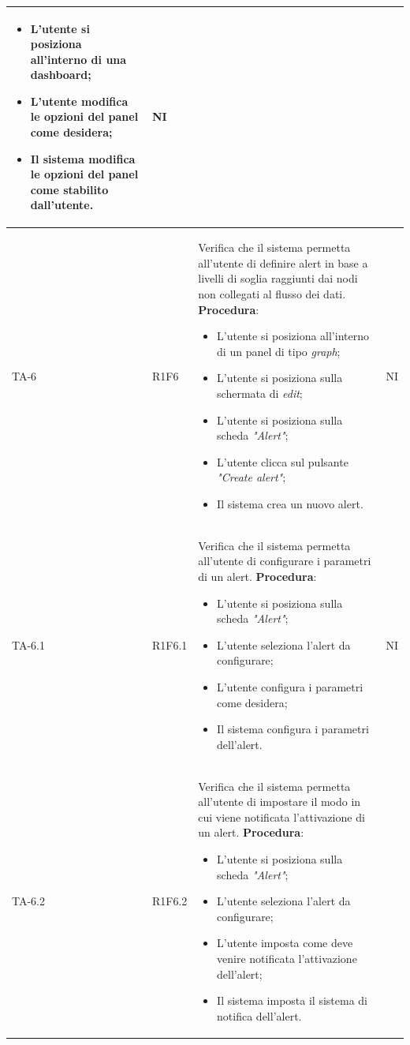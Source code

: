 \begin{longtable}{|C{2.5cm}|C{2.5cm}|L{6.5cm}|C{1.5cm}|}
\begin{itemize}
		\item L'utente si posiziona all'interno di una dashboard;
		\item L'utente modifica le opzioni del panel come desidera;
		\item Il sistema modifica le opzioni del panel come stabilito dall'utente.
	\end{itemize}
	 & {NI}\\
	\hline
	{TA-6} & {R1F6} & 
	Verifica che il sistema permetta all'utente di definire alert in base a livelli di soglia raggiunti dai nodi non collegati al flusso dei dati.
	\textbf{Procedura}:
	\begin{itemize}		
		\item L'utente si posiziona all'interno di un panel di tipo \emph{graph};
		\item L'utente si posiziona sulla schermata di \emph{edit};
		\item L'utente si posiziona sulla scheda \emph{"Alert"};
		\item L'utente clicca sul pulsante \emph{"Create alert"};
		\item Il sistema crea un nuovo alert.
	\end{itemize}
	 & {NI}\\
	\hline
	{TA-6.1} & {R1F6.1} & 
	Verifica che il sistema permetta all'utente di configurare i parametri di un alert.
	\textbf{Procedura}:
	\begin{itemize}		
		\item L'utente si posiziona sulla scheda \emph{"Alert"};
		\item L'utente seleziona l'alert da configurare;
		\item L'utente configura i parametri come desidera;
		\item Il sistema configura i parametri dell'alert.
	\end{itemize}
	 & {NI}\\
	\hline
	{TA-6.2} & {R1F6.2} & 
	Verifica che il sistema permetta all'utente di impostare il modo in cui viene notificata l'attivazione di un alert.
	\textbf{Procedura}:
	\begin{itemize}		
		\item L'utente si posiziona sulla scheda \emph{"Alert"};
		\item L'utente seleziona l'alert da configurare;
		\item L'utente imposta come deve venire notificata l'attivazione dell'alert;
		\item Il sistema imposta il sistema di notifica dell'alert.

\end{itemize}
\end{longtable}
